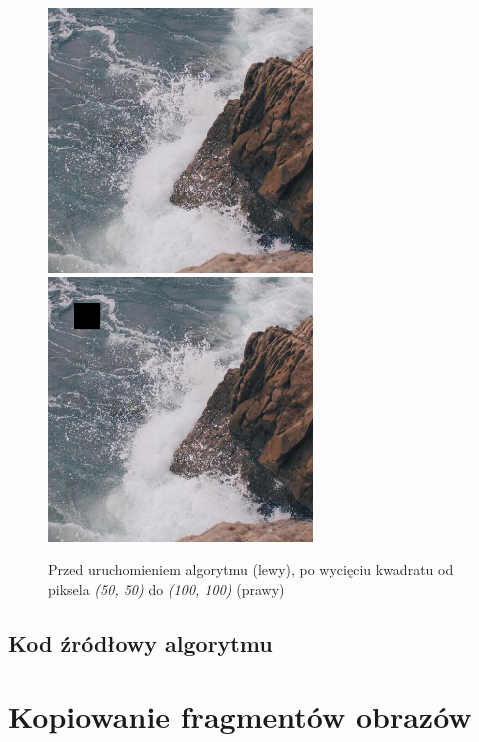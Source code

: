 \documentclass[a4paper,12pt]{book}
\begin{document}
\begin{figure}[H]
	\caption{Przed uruchomieniem algorytmu (lewy), po wycięciu kwadratu od piksela \textit{(50, 50)} do \textit{(100, 100)} (prawy)}
	\includegraphics[width=7cm, height=7cm]{sea-unmodified.jpg}
	\includegraphics[width=7cm, height=7cm]{4-5/crop-sea.png}
\end{figure}

\subsection*{Kod źródłowy algorytmu}

\section{Kopiowanie fragmentów obrazów}
\end{document}
